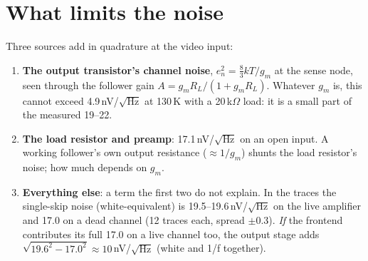 \documentclass[11pt]{article}
\begin{document}
\section{What limits the noise}\label{sec:noise}
Three sources add in quadrature at the video input:
\begin{enumerate}
\item \textbf{The output transistor's channel noise}, $e_n^2=\tfrac83kT/g_m$ at the sense node, seen through the
  follower gain $A=g_mR_L/(1+g_mR_L)$. Whatever $g_m$ is, this cannot exceed 4.9\,nV/$\sqrt{\text{Hz}}$ at 130\,K with a
  20\,k$\Omega$ load: it is a small part of the measured 19--22.
\item \textbf{The load resistor and preamp}: 17.1\,nV/$\sqrt{\text{Hz}}$ on an open input. A working follower's own
  output resistance ($\approx1/g_m$) shunts the load resistor's noise; how much depends on $g_m$.
\item \textbf{Everything else}: a term the first two do not explain. In the traces the single-skip noise
  (white-equivalent) is 19.5--19.6\,nV/$\sqrt{\text{Hz}}$ on the live amplifier and 17.0 on a dead channel (12 traces each,
  spread $\pm$0.3). \emph{If} the frontend contributes its full 17.0 on a live channel too, the output stage adds
  $\sqrt{19.6^2-17.0^2}\approx10$\,nV/$\sqrt{\text{Hz}}$ (white and 1/f together).
\end{enumerate}
\end{document}
